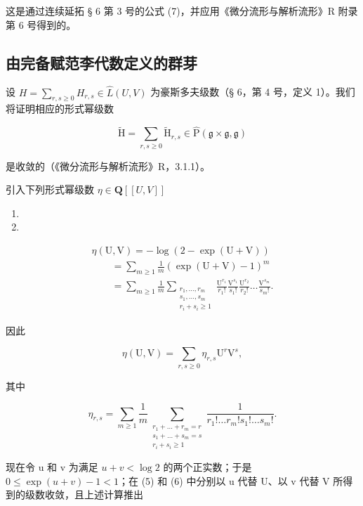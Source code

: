 这是通过连续延拓 § 6 第 3 号的公式 (7)，并应用《微分流形与解析流形》R 附录第 6 号得到的。

\subsection{由完备赋范李代数定义的群芽}

设 \(H = \sum_{r,s \geqslant 0} H_{r,s} \in \hat{L}(U, V)\) 为豪斯多夫级数（§ 6，第 4 号，定义 1）。我们将证明相应的形式幂级数

\[
\tilde {\mathrm{H}} = \sum_ {r, s \geqslant 0} \tilde {\mathrm{H}} _ {r, s} \in \hat {\mathrm{P}} (\mathfrak {g} \times \mathfrak {g}, \mathfrak {g})\tag{3}
\]

是收敛的（《微分流形与解析流形》R，3.1.1）。

引入下列形式幂级数 \(\eta\in\mathbf{Q}[[U,V]]\)

\begin{enumerate}
\def\labelenumi{(\arabic{enumi})}
\setcounter{enumi}{3}
\tightlist
\item
\item
\end{enumerate}

\[
\begin{array}{l}\eta (\mathrm{U},\mathrm{V}) = -\log (2 - \exp (\mathrm{U} + \mathrm{V}))\\ \qquad = \sum_{m\geqslant 1}\frac{1}{m} (\exp (\mathrm{U} + \mathrm{V}) - 1)^{m}\\ \qquad = \sum_{m\geqslant 1}\frac{1}{m}\sum_{\substack{r_{1},\ldots ,r_{m}\\ s_{1},\ldots ,s_{m}\\ r_{i} + s_{i}\geqslant 1}}\frac{\mathrm{U}^{r_{1}}}{r_{1}!}\frac{\mathrm{V}^{s_{1}}}{s_{1}!}\frac{\mathrm{U}^{r_{2}}}{r_{2}!}\dots \frac{\mathrm{V}^{s_{m}}}{s_{m}!}. \end{array}\tag{6}
\]

因此

\[
\eta (\mathrm{U}, \mathrm{V}) = \sum_ {r, s \geqslant 0} \eta_ {r, s} \mathrm{U} ^ {r} \mathrm{V} ^ {s},\tag{7}
\]

其中

\[
\eta_{r,s} = \sum_{m\geqslant 1}\frac{1}{m}\sum_{\substack{r_{1} + \dots +r_{m} = r\\ s_{1} + \dots +s_{m} = s\\ r_{i} + s_{i}\geqslant 1}}\frac{1}{r_{1}!\ldots r_{m}!s_{1}!\ldots s_{m}!}.\tag{8}
\]

现在令 u 和 v 为满足 \(u + v < \log 2\) 的两个正实数；于是 \(0 \leqslant \exp(u + v) - 1 < 1\)；在 (5) 和 (6) 中分别以 u 代替 U、以 v 代替 V 所得到的级数收敛，且上述计算推出

